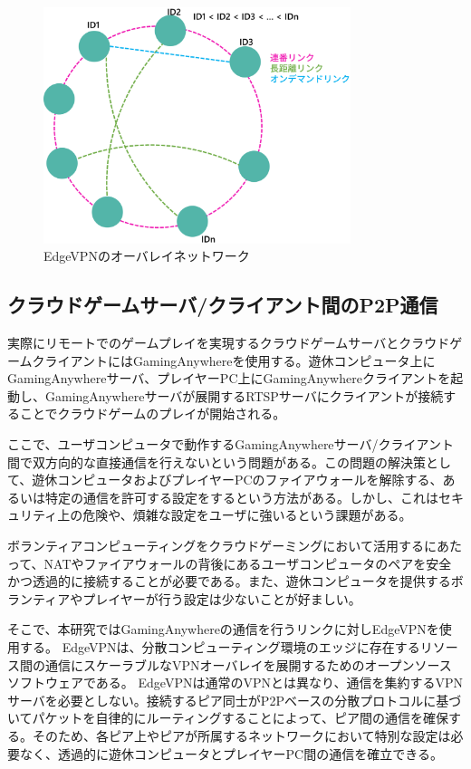 \begin{figure}[h!]
    \centering
    \includegraphics[width=0.8\textwidth,keepaspectratio,clip]{img/overlay_topology.eps}
    \caption{EdgeVPNのオーバレイネットワーク}
    \label{fig:overlay}
\end{figure}

\subsection{クラウドゲームサーバ/クライアント間のP2P通信}
実際にリモートでのゲームプレイを実現するクラウドゲームサーバとクラウドゲームクライアントにはGamingAnywhereを使用する。遊休コンピュータ上にGamingAnywhereサーバ、プレイヤーPC上にGamingAnywhereクライアントを起動し、GamingAnywhereサーバが展開するRTSPサーバにクライアントが接続することでクラウドゲームのプレイが開始される。

ここで、ユーザコンピュータで動作するGamingAnywhereサーバ/クライアント間で双方向的な直接通信を行えないという問題がある。この問題の解決策として、遊休コンピュータおよびプレイヤーPCのファイアウォールを解除する、あるいは特定の通信を許可する設定をするという方法がある。しかし、これはセキュリティ上の危険や、煩雑な設定をユーザに強いるという課題がある。

ボランティアコンピューティングをクラウドゲーミングにおいて活用するにあたって、NATやファイアウォールの背後にあるユーザコンピュータのペアを安全かつ透過的に接続することが必要である。また、遊休コンピュータを提供するボランティアやプレイヤーが行う設定は少ないことが好ましい。

そこで、本研究ではGamingAnywhereの通信を行うリンクに対しEdgeVPN\cite{edgevpn}を使用する。
EdgeVPNは、分散コンピューティング環境のエッジに存在するリソース間の通信にスケーラブルなVPNオーバレイを展開するためのオープンソースソフトウェアである。
EdgeVPNは通常のVPNとは異なり、通信を集約するVPNサーバを必要としない。接続するピア同士がP2Pベースの分散プロトコルに基づいてパケットを自律的にルーティングすることによって、ピア間の通信を確保する。そのため、各ピア上やピアが所属するネットワークにおいて特別な設定は必要なく、透過的に遊休コンピュータとプレイヤーPC間の通信を確立できる。

